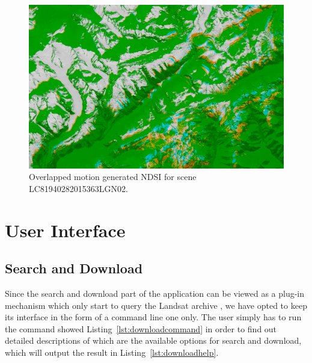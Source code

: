 \documentclass[12pt, a4paper]{report}
\begin{document}
	\begin{figure}[h!]
		\centering
		\includegraphics[width=\linewidth]{../images/LC81940282015363LGN02_motion_predicted_overlay.png}
		\caption{Overlapped motion generated NDSI for scene LC81940282015363LGN02.}
		\label{fig:overlapped_motion_predicted_image}
	\end{figure}


	\newpage{}
	\section{User Interface}
	\label{seq:gui}
	
	\subsection{Search and Download}
	\label{subsec:search_download}
	
	\par Since the search and download part of the application can be viewed as a plug-in mechanism which only start to query the Landsat archive , we have opted to keep its interface in the form of a command line one only. The user simply has to run the command showed Listing~\ref{lst:downloadcommand} in order to find out detailed descriptions of which are the available options for search and download, which will output the result in Listing~\ref{lst:downloadhelp}.
	
	\begin{lstlisting}[caption={Command for sarch and download details},label={lst:downloadcommand},language=Bash]
		% bash -x run_download.sh --help
	\end{lstlisting}
	
\end{document}
